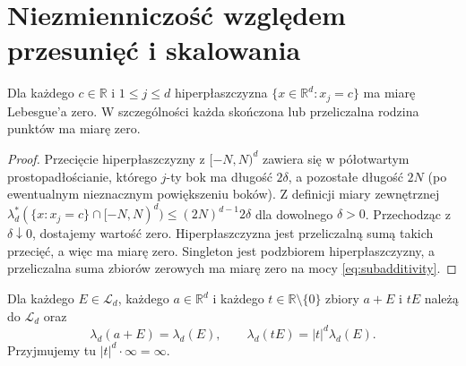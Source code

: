 \section{Niezmienniczość względem przesunięć i skalowania}

\begin{lemat}
\label{lem:hyperplane-null}
Dla każdego $c\in\mathbb R$ i $1\le j\le d$
hiperpłaszczyzna $\{x\in\mathbb R^d:x_j=c\}$ ma
miarę Lebesgue'a zero. W szczególności każda skończona
lub przeliczalna rodzina punktów ma miarę zero.
\end{lemat}

\begin{proof}
Przecięcie hiperpłaszczyzny z $[-N,N)^d$ zawiera się
w półotwartym prostopadłościanie, którego $j$-ty bok
ma długość $2\delta$, a pozostałe długość $2N$
(po ewentualnym nieznacznym powiększeniu boków).
Z definicji miary zewnętrznej
$\lambda_d^*(\{x:x_j=c\}\cap[-N,N)^d)
\le (2N)^{d-1}2\delta$ dla dowolnego $\delta>0$.
Przechodząc z $\delta\downarrow0$, dostajemy wartość zero.
Hiperpłaszczyzna jest przeliczalną sumą takich przecięć,
a więc ma miarę zero. Singleton jest podzbiorem
hiperpłaszczyzny, a przeliczalna suma zbiorów zerowych
ma miarę zero na mocy \eqref{eq:subadditivity}.
\end{proof}

\begin{twierdzenie}
\label{thm:invariance-lebesgue}
Dla każdego $E\in\mathcal L_d$, każdego
$a\in\mathbb R^d$ i każdego $t\in\mathbb R\setminus\{0\}$
zbiory $a+E$ i $tE$ należą do $\mathcal L_d$ oraz
\begin{equation}\label{eq:lebesgue-invariance}
\lambda_d(a+E)=\lambda_d(E),\qquad
\lambda_d(tE)=|t|^d\lambda_d(E).
\end{equation}
Przyjmujemy tu $|t|^d\cdot\infty=\infty$.
\end{twierdzenie}

